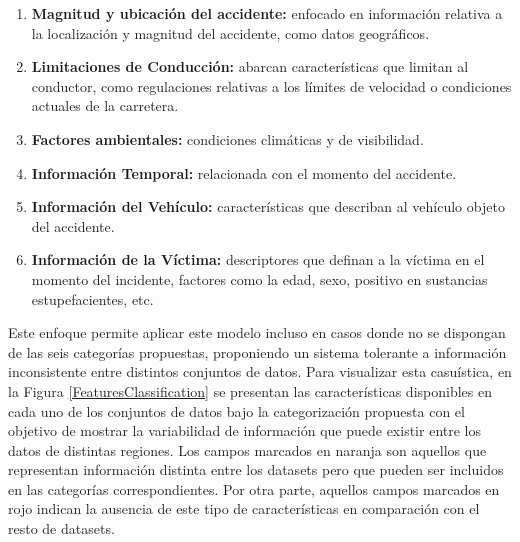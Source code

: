 \begin{enumerate}
	\item \textbf{Magnitud y ubicación del accidente:} enfocado en información relativa a la localización y magnitud del accidente, como datos geográficos.
	\item \textbf{Limitaciones de Conducción:} abarcan características que limitan al conductor, como regulaciones relativas a los límites de velocidad o condiciones actuales de la carretera.
	\item \textbf{Factores ambientales:} condiciones climáticas y de visibilidad.
	\item \textbf{Información Temporal:} relacionada con el momento del accidente.
	\item \textbf{Información del Vehículo:} características que describan al vehículo objeto del accidente.
	\item \textbf{Información de la Víctima:} descriptores que definan a la víctima en el momento del incidente, factores como la edad, sexo, positivo en sustancias estupefacientes, etc.
\end{enumerate}

Este enfoque permite aplicar este modelo incluso en casos donde no se dispongan de las seis categorías propuestas, proponiendo un sistema tolerante a información inconsistente entre distintos conjuntos de datos. Para visualizar esta casuística, en la Figura \ref{FeaturesClassification} se presentan las características disponibles en cada uno de los conjuntos de datos bajo la categorización propuesta con el objetivo de mostrar la variabilidad de información que puede existir entre los datos de distintas regiones. Los campos marcados en naranja son aquellos que representan información distinta entre los datasets pero que pueden ser incluidos en las categorías correspondientes. Por otra parte, aquellos campos marcados en rojo indican la ausencia de este tipo de características en comparación con el resto de datasets.

